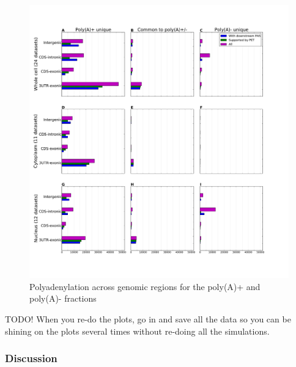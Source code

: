 \begin{figure}[htb]
	\begin{center}
		\includegraphics[scale=0.4]{figures/polyadenylation/intersected_sidebars_pA_2+.pdf}
	\end{center}
	\caption{Polyadenylation across genomic regions for the poly(A)+ and poly(A)-
	fractions}
	\label{fig:sidebars}
\end{figure}

TODO! When you re-do the plots, go in and save all the data so you can be
shining on the plots several times without re-doing all the simulations.

\subsubsection{Discussion}

